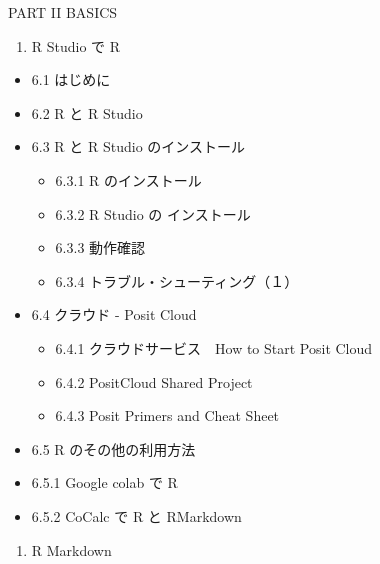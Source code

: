 \documentclass[
  xelatex, ja=standard]{bxjsbook}
\providecommand{\tightlist}{%
  \setlength{\itemsep}{0pt}\setlength{\parskip}{0pt}}
\theoremstyle{definition}
\theoremstyle{definition}
\theoremstyle{definition}
\theoremstyle{definition}
\theoremstyle{remark}
\begin{document}
PART II BASICS

\begin{enumerate}
\def\labelenumi{\arabic{enumi}.}
\setcounter{enumi}{20}
\tightlist
\item
  R Studio で R
\end{enumerate}

\begin{itemize}
\tightlist
\item
  6.1 はじめに
\item
  6.2 R と R Studio
\item
  6.3 R と R Studio のインストール

  \begin{itemize}
  \tightlist
  \item
    6.3.1 R のインストール
  \item
    6.3.2 R Studio の インストール
  \item
    6.3.3 動作確認
  \item
    6.3.4 トラブル・シューティング（１）
  \end{itemize}
\item
  6.4 クラウド - Posit Cloud

  \begin{itemize}
  \tightlist
  \item
    6.4.1 クラウドサービス　How to Start Posit Cloud
  \item
    6.4.2 PositCloud Shared Project
  \item
    6.4.3 Posit Primers and Cheat Sheet
  \end{itemize}
\item
  6.5 R のその他の利用方法
\item
  6.5.1 Google colab で R
\item
  6.5.2 CoCalc で R と RMarkdown
\end{itemize}

\begin{enumerate}
\def\labelenumi{\arabic{enumi}.}
\setcounter{enumi}{21}
\tightlist
\item
  R Markdown
\end{enumerate}
\end{document}
